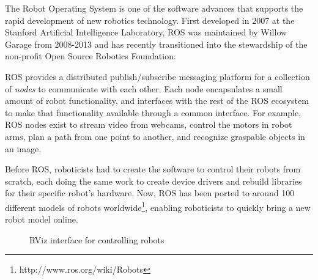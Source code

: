 \documentclass[11pt,twocolumn]{article}
\begin{document}

The Robot Operating System\cite{ros} is one of the software advances that supports the rapid development of new robotics technology.  First developed in 2007 at the Stanford Artificial Intelligence Laboratory, ROS was maintained by Willow Garage from 2008-2013 and has recently transitioned into the stewardship of the non-profit Open Source Robotics Foundation.

ROS provides a distributed publish/subscribe messaging platform for a collection of {\em nodes} to communicate with each other. Each node encapsulates a small amount of robot functionality, and interfaces with the rest of the ROS ecosystem to make that functionality available through a common interface. For example, ROS nodes exist to stream video from webcams, control the motors in robot arms, plan a path from one point to another, and recognize graspable objects in an image.

Before ROS, roboticists had to create the software to control their robots from scratch, each doing the same work to create device drivers and rebuild libraries for their specific robot's hardware.  Now, ROS has been ported to around 100 different models of robots worldwide\footnote{http://www.ros.org/wiki/Robots}, enabling roboticists to quickly bring a new robot model online.

\begin{figure}[tbh]
\caption{RViz interface for controlling robots}
\label{rviz}
\end{figure}
\end{document}

